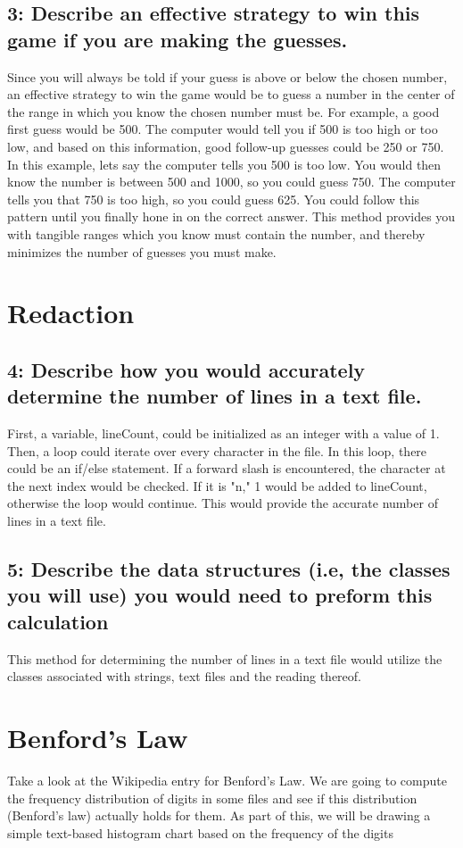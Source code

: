 \documentclass[a4paper,11pt]{article}
\theoremstyle{mytheor}
\begin{document}
\subsection*{3: Describe an effective strategy to win this game if you are making the guesses.}
Since you will always be told if your guess is above or below the chosen number, an effective strategy to win the game would be to guess a number in the center of the range in which you know the chosen number must be. For example, a good first guess would be 500. The computer would tell you if 500 is too high or too low, and based on this information, good follow-up guesses could be 250 or 750. In this example, lets say the computer tells you 500 is too low. You would then know the number is between 500 and 1000, so you could guess 750. The computer tells you that 750 is too high, so you could guess 625. You could follow this pattern until you finally hone in on the correct answer. This method provides you with tangible ranges which you know must contain the number, and thereby minimizes the number of guesses you must make.

\section*{Redaction}
\subsection*{4: Describe how you would accurately determine the number of lines in a text file.}
First, a variable, lineCount, could be initialized as an integer with a value of 1. Then, a loop could iterate over every character in the file. In this loop, there could be an if/else statement. If a forward slash is encountered, the character at the next index would be checked. If it is "n," 1 would be added to lineCount, otherwise the loop would continue. This would provide the accurate number of lines in a text file.

\subsection*{5: Describe the data structures (i.e, the classes you will use) you would need to preform this calculation}
This method for determining the number of lines in a text file would utilize the classes associated with strings, text files and the reading thereof.

\section*{Benford's Law}
Take a look at the Wikipedia entry for Benford's Law. We are going to compute the frequency distribution of digits in some files and see if this distribution (Benford's law) actually holds for them. As part of this, we will be drawing a simple text-based histogram chart based on the frequency of the digits
\end{document}
